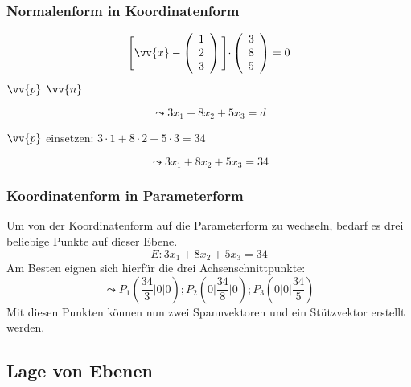 \documentclass[a4paper, 15pt]{article}
\begin{document}
\subsubsection{Normalenform in Koordinatenform}
\begin{minipage}{.49\textwidth}
\begin{equation*}
\Biggl[\vv{x}-\left(\begin{array}{c} 1 \\ 2 \\ 3 \end{array}\right)\Biggl]\cdot \left(\begin{array}{c} 3 \\ 8 \\ 5 \end{array}\right) = 0
\end{equation*}
\hspace{3.45cm} $\vv{p}$ \hspace{0.8cm} $\vv{n}$
\end{minipage}
\begin{minipage}{.49\textwidth}
\begin{equation*}
\leadsto 3x_1 + 8x_2 + 5x_3 =d
\end{equation*}
\begin{center}
$\vv{p}$ einsetzen: $3\cdot1+8\cdot2+5\cdot3=34$
\end{center}
\begin{equation*}
\leadsto 3x_1 + 8x_2 + 5x_3 = 34
\end{equation*}
\end{minipage}
\subsubsection{Koordinatenform in Parameterform}
Um von der Koordinatenform auf die Parameterform zu wechseln, bedarf es drei beliebige Punkte auf dieser Ebene.
\begin{equation*}
E: 3x_1 + 8x_2 + 5x_3 = 34
\end{equation*}
Am Besten eignen sich hierfür die drei Achsenschnittpunkte:
\begin{equation*}
\leadsto P_1\left(\dfrac{34}{3}\biggl|0\biggl|0\right); P_2\left(0\biggl|\dfrac{34}{8}\biggl|0\right); P_3\left(0\biggl|0\biggl|\dfrac{34}{5}\right) 
\end{equation*}
Mit diesen Punkten können nun zwei Spannvektoren und ein Stützvektor erstellt werden.
\subsection{Lage von Ebenen}
\end{document}

